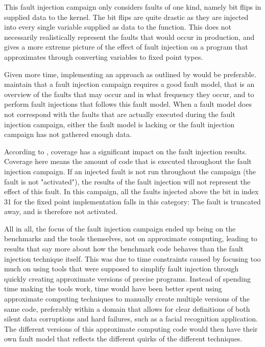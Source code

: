 This fault injection campaign only considers faults of one kind, namely bit flips in supplied data to the kernel. The bit flips are quite drastic as they are injected into every single variable supplied as data to the function. This does not necessarily realistically represent the faults that would occur in production, and gives a more extreme picture of the effect of fault injection on a program that approximates through converting variables to fixed point types. 

Given more time, implementing an approach as outlined by \citet{van2016finding} would be preferable. \citet{van2016finding} maintain that a fault injection campaign requires a good fault model, that is an overview of the faults that may occur and in what frequency they occur, and to perform fault injections that follows this fault model. When a fault model does not correspond with the faults that are actually executed during the fault injection campaign, either the fault model is lacking or the fault injection campaign has not gathered enough data. 

According to \citet{van2016finding}, coverage has a significant impact on the fault injection results. Coverage here means the amount of code that is executed throughout the fault injection campaign. If an injected fault is not run throughout the campaign (the fault is not "activated"), the results of the fault injection will not represent the effect of this fault. In this campaign, all the faults injected above the bit in index 31 for the fixed point implementation falls in this category: The fault is truncated away, and is therefore not activated. 

All in all, the focus of the fault injection campaign ended up being on the benchmarks and the tools themselves, not on approximate computing, leading to results that say more about how the benchmark code behaves than the fault injection technique itself. This was due to time constraints caused by focusing too much on using tools that were supposed to simplify fault injection through quickly creating approximate versions of precise programs. Instead of spending time making the tools work, time would have been better spent using approximate computing techniques to manually create multiple versions of the same code, preferably within a domain that allows for clear definitions of both silent data corruptions and hard failures, such as a facial recognition application. The different versions of this approximate computing code would then have their own fault model that reflects the different quirks of the different techniques. 



